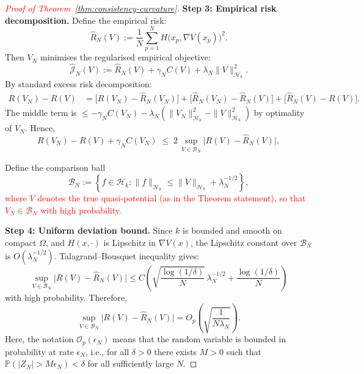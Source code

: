 \documentclass[11pt]{article}
\theoremstyle{plain}      %
\theoremstyle{definition} %
\begin{document}
\begin{proof}[\textcolor{red}{Proof of Theorem~\ref{thm:consistency-curvature}}]
\medskip
\noindent\textbf{Step 3: Empirical risk decomposition.}
Define the empirical risk:
\[
  \widehat R_{N}(V)
  :=\frac1N\sum_{p=1}^{N}
     H\!\bigl(x_{p},\nabla V(x_{p})\bigr)^{2}.
\]
Then $V_{N}$ minimises the regularised empirical objective:
\[
  \widehat{\mathcal J}_{N}(V)
    :=\widehat R_{N}(V)+\gamma_{N}C(V)+\lambda_{N}\|V\|_{\mathcal H_{k}}^{2}.
\]
By standard excess risk decomposition:
\begin{align*}
  R(V_{N})-R(V)
  &= \bigl[R(V_{N})-\widehat R_{N}(V_{N})\bigr]
   +\bigl[\widehat R_{N}(V_{N})-\widehat R_{N}(V)\bigr]
   +\bigl[\widehat R_{N}(V)-R(V)\bigr].
\end{align*}
The middle term is $\le -\gamma_{N}C(V_{N}) - \lambda_{N}(\|V_{N}\|_{\mathcal H_{k}}^{2} - \|V\|_{\mathcal H_{k}}^{2})$ by optimality of $V_{N}$.
Hence,
\begin{equation}\label{eq:excess-risk-revised}
  R(V_{N})-R(V) + \gamma_{N}C(V_{N})
  \;\le\;
  2\,\sup_{V\in\mathcal B_{N}}
  \bigl|R(V)-\widehat R_{N}(V)\bigr|,
\end{equation}

Define the comparison ball
\[
  \mathcal{B}_N := \left\{ f \in \mathcal{H}_k : \|f\|_{\mathcal{H}_k} \le \|V\|_{\mathcal{H}_k} + \lambda_N^{-1/2} \right\},
\]
\textcolor{red}{where $V$ denotes the true quasi-potential (as in the Theorem statement), so that $V_N \in \mathcal{B}_N$ with high probability.}


\medskip
\noindent\textbf{Step 4: Uniform deviation bound.}
Since $k$ is bounded and smooth on compact $\Omega$, and $H(x,\cdot)$ is Lipschitz in $\nabla V(x)$, the Lipschitz constant over $\mathcal B_{N}$ is $O(\lambda_{N}^{-1/2})$. Talagrand–Bousquet inequality gives:
\[
  \sup_{V\in\mathcal B_{N}}
  \bigl|R(V)-\widehat R_{N}(V)\bigr|
  \le
  C\left( \sqrt{\frac{\log(1/\delta)}{N}}\,\lambda_{N}^{-1/2}
         + \frac{\log(1/\delta)}{N} \right)
\]
with high probability. Therefore,
\[
  \sup_{V\in\mathcal B_{N}} \bigl|R(V)-\widehat R_{N}(V)\bigr| = O_{p}\!\left(\sqrt{\frac{1}{N\lambda_{N}}}\right).
\]
Here, the notation $\mathcal{O}_p(\epsilon_N)$ means that the random variable is bounded in probability at rate $\epsilon_N$, i.e., for all $\delta > 0$ there exists $M > 0$ such that
$\mathbb{P}(|Z_N| > M\epsilon_N) < \delta$ for all sufficiently large $N$.


\end{proof}
\end{document}
